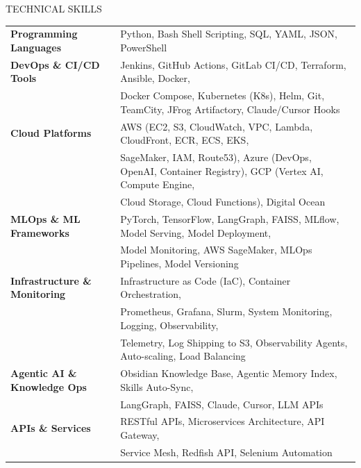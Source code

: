 \documentclass{resume} %
\begin{document}
\begin{rSection}{TECHNICAL SKILLS}

\begin{tabular}{ @{} >{\bfseries}l @{\hspace{6ex}} l }
Programming Languages & Python, Bash Shell Scripting, SQL, YAML, JSON, PowerShell
\\
DevOps \& CI/CD Tools & Jenkins, GitHub Actions, GitLab CI/CD, Terraform, Ansible, Docker, 
\\ & Docker Compose, Kubernetes (K8s), Helm, Git, TeamCity, JFrog Artifactory, Claude/Cursor Hooks
\\
Cloud Platforms & AWS (EC2, S3, CloudWatch, VPC, Lambda, CloudFront, ECR, ECS, EKS, 
\\ & SageMaker, IAM, Route53), Azure (DevOps, OpenAI, Container Registry), GCP (Vertex AI, Compute Engine, 
\\ & Cloud Storage, Cloud Functions), Digital Ocean
\\
MLOps \& ML Frameworks & PyTorch, TensorFlow, LangGraph, FAISS, MLflow, Model Serving, Model Deployment, 
\\ & Model Monitoring, AWS SageMaker, MLOps Pipelines, Model Versioning
\\
Infrastructure \& Monitoring & Infrastructure as Code (IaC), Container Orchestration, 
\\ & Prometheus, Grafana, Slurm, System Monitoring, Logging, Observability, 
\\ & Telemetry, Log Shipping to S3, Observability Agents, Auto-scaling, Load Balancing
\\
Agentic AI \& Knowledge Ops & Obsidian Knowledge Base, Agentic Memory Index, Skills Auto-Sync,
\\ & LangGraph, FAISS, Claude, Cursor, LLM APIs
\\
APIs \& Services & RESTful APIs, Microservices Architecture, API Gateway, 
\\ & Service Mesh, Redfish API, Selenium Automation
\end{tabular}

\end{rSection}



\end{document}
